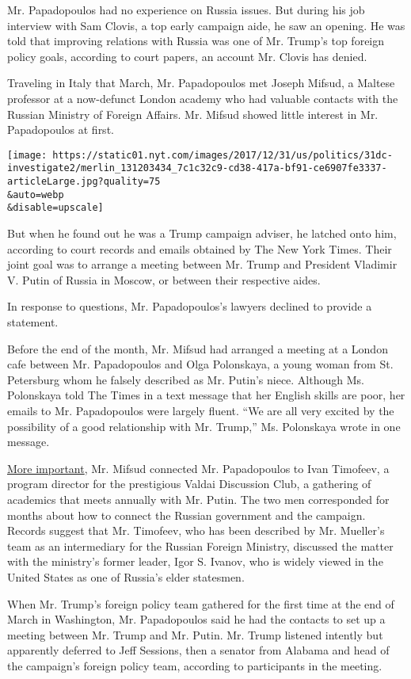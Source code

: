 Mr. Papadopoulos had no experience on Russia issues. But during his job
interview with Sam Clovis, a top early campaign aide, he saw an opening.
He was told that improving relations with Russia was one of Mr. Trump's
top foreign policy goals, according to court papers, an account Mr.
Clovis has denied.

Traveling in Italy that March, Mr. Papadopoulos met Joseph Mifsud, a
Maltese professor at a now-defunct London academy who had valuable
contacts with the Russian Ministry of Foreign Affairs. Mr. Mifsud showed
little interest in Mr. Papadopoulos at first.

\texttt{[image: https://static01.nyt.com/images/2017/12/31/us/politics/31dc-investigate2/merlin\_131203434\_7c1c32c9-cd38-417a-bf91-ce6907fe3337-articleLarge.jpg?quality=75\\\&auto=webp\\\&disable=upscale]}

But when he found out he was a Trump campaign adviser, he latched onto
him, according to court records and emails obtained by The New York
Times. Their joint goal was to arrange a meeting between Mr. Trump and
President Vladimir V. Putin of Russia in Moscow, or between their
respective aides.

In response to questions, Mr. Papadopoulos's lawyers declined to provide
a statement.

Before the end of the month, Mr. Mifsud had arranged a meeting at a
London cafe between Mr. Papadopoulos and Olga Polonskaya, a young woman
from St. Petersburg whom he falsely described as Mr. Putin's niece.
Although Ms. Polonskaya told The Times in a text message that her
English skills are poor, her emails to Mr. Papadopoulos were largely
fluent. ``We are all very excited by the possibility of a good
relationship with Mr. Trump,'' Ms. Polonskaya wrote in one message.

\href{https://www.nytimes.com/2017/11/10/us/russia-inquiry-trump.html}{More
important}, Mr. Mifsud connected Mr. Papadopoulos to Ivan Timofeev, a
program director for the prestigious Valdai Discussion Club, a gathering
of academics that meets annually with Mr. Putin. The two men
corresponded for months about how to connect the Russian government and
the campaign. Records suggest that Mr. Timofeev, who has been described
by Mr. Mueller's team as an intermediary for the Russian Foreign
Ministry, discussed the matter with the ministry's former leader, Igor
S. Ivanov, who is widely viewed in the United States as one of Russia's
elder statesmen.

When Mr. Trump's foreign policy team gathered for the first time at the
end of March in Washington, Mr. Papadopoulos said he had the contacts to
set up a meeting between Mr. Trump and Mr. Putin. Mr. Trump listened
intently but apparently deferred to Jeff Sessions, then a senator from
Alabama and head of the campaign's foreign policy team, according to
participants in the meeting.

